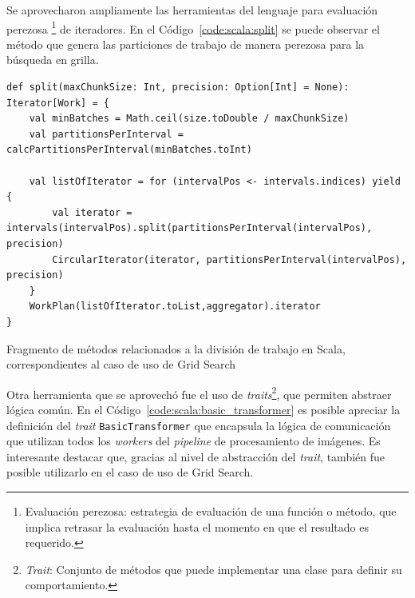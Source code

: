 \documentclass[11pt]{article}
\newcommand{\english}[1]{\textit{#1}}
\begin{document}
Se aprovecharon ampliamente las herramientas del lenguaje para evaluación perezosa \footnote{Evaluación perezosa: estrategia de evaluación de una función o método, que implica retrasar la evaluación hasta el momento en que el resultado es requerido.} de iteradores. En el Código~\ref{code:scala:split} se puede observar el método que genera las particiones de trabajo de manera perezosa para la búsqueda en grilla.

\begin{listing}[ht]
\begin{verbatim}
def split(maxChunkSize: Int, precision: Option[Int] = None): Iterator[Work] = {
    val minBatches = Math.ceil(size.toDouble / maxChunkSize)
    val partitionsPerInterval = calcPartitionsPerInterval(minBatches.toInt)

    val listOfIterator = for (intervalPos <- intervals.indices) yield {
        val iterator = intervals(intervalPos).split(partitionsPerInterval(intervalPos), precision)
        CircularIterator(iterator, partitionsPerInterval(intervalPos), precision)
    }
    WorkPlan(listOfIterator.toList,aggregator).iterator
}
\end{verbatim}
\caption{Fragmento de métodos relacionados a la división de trabajo en Scala, correspondientes al caso de uso de Grid Search}
\label{code:scala:split}
\end{listing}

Otra herramienta que se aprovechó fue el uso de \english{traits}\footnote{\english{Trait}: Conjunto de métodos que puede implementar una clase para definir su comportamiento.}, que permiten abstraer lógica común. En el Código~\ref{code:scala:basic_transformer} es posible apreciar la definición del \english{trait} \lstinline{BasicTransformer} que encapsula la lógica de comunicación que utilizan todos los \english{workers} del \english{pipeline} de procesamiento de imágenes. Es interesante destacar que, gracias al nivel de abstracción del \english{trait}, también fue posible utilizarlo en el caso de uso de Grid Search.
\end{document}
